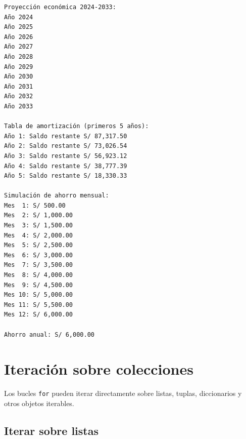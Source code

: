 \documentclass[
  doc,
  floatsintext,
  longtable,
  a4paper,
  nolmodern,
  notxfonts,
  notimes,
  12pt,
  colorlinks=true,linkcolor=blue,citecolor=blue,urlcolor=blue]{apa7}
\begin{document}
\begin{verbatim}
Proyección económica 2024-2033:
Año 2024
Año 2025
Año 2026
Año 2027
Año 2028
Año 2029
Año 2030
Año 2031
Año 2032
Año 2033

Tabla de amortización (primeros 5 años):
Año 1: Saldo restante S/ 87,317.50
Año 2: Saldo restante S/ 73,026.54
Año 3: Saldo restante S/ 56,923.12
Año 4: Saldo restante S/ 38,777.39
Año 5: Saldo restante S/ 18,330.33

Simulación de ahorro mensual:
Mes  1: S/ 500.00
Mes  2: S/ 1,000.00
Mes  3: S/ 1,500.00
Mes  4: S/ 2,000.00
Mes  5: S/ 2,500.00
Mes  6: S/ 3,000.00
Mes  7: S/ 3,500.00
Mes  8: S/ 4,000.00
Mes  9: S/ 4,500.00
Mes 10: S/ 5,000.00
Mes 11: S/ 5,500.00
Mes 12: S/ 6,000.00

Ahorro anual: S/ 6,000.00
\end{verbatim}

\section{Iteración sobre
colecciones}\label{iteraciuxf3n-sobre-colecciones}

Los bucles \texttt{for} pueden iterar directamente sobre listas, tuplas,
diccionarios y otros objetos iterables.

\subsection{Iterar sobre listas}\label{iterar-sobre-listas}
\end{document}
